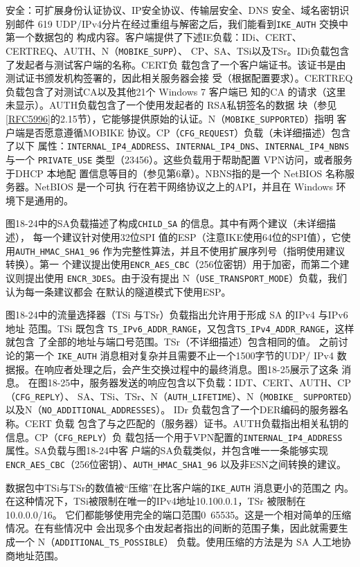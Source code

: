 安全：可扩展身份认证协议、IP安全协议、传输层安全、DNS 安全、域名密钥识别邮件 619
UDP/IPv4分片在经过重组与解密之后，我们能看到\verb|IKE_AUTH| 交换中第一个数据包的
构成内容。客户端提供了下述IE负载：IDi、CERT、CERTREQ、AUTH、N（\verb|MOBIKE_SUPP|）、
CP、SA、TSi以及TSr。IDi负载包含了发起者与测试客户端的名称。CERT负
载包含了一个客户端证书。该证书是由测试证书颁发机构签署的，因此相关服务器会接
受（根据配置要求）。CERTREQ负载包含了对测试CA以及其他21个 Windows 7 客户端已
知的CA 的请求（这里未显示）。AUTH负载包含了一个使用发起者的 RSA私钥签名的数据
块（参见\href{https://www.rfc-editor.org/rfc/rfc5996}{[RFC5996]}的2.15节），它能够提供原始的认证。N（\verb|MOBIKE_SUPPORTED|）指明
客户端是否愿意遵循MOBIKE 协议。CP（\verb|CFG_REQUEST|）负载（未详细描述）包含了以下
属性：\verb|INTERNAL_IP4_ADDRESS|、\verb|INTERNAL_IP4_DNS|、\verb|INTERNAL_IP4_NBNS| 与一个
\verb|PRIVATE_USE| 类型（23456）。这些负载用于帮助配置 VPN访问，或者服务于DHCP 本地配
置信息等目的（参见第6章）。NBNS指的是一个 NetBIOS 名称服务器。NetBIOS 是一个可执
行在若干网络协议之上的API，并且在 Windows 环境下是通用的。

图18-24中的SA负载描述了构成\verb|CHILD_SA| 的信息。其中有两个建议（未详细描述），
每一个建议针对使用32位SPI 值的ESP（注意IKE使用64位的SPI值），它使用\verb|AUTH_HMAC_SHA1_96|
 作为完整性算法，并且不使用扩展序列号（指明使用建议转换）。第一
个建议提出使用\verb|ENCR_AES_CBC|（256位密钥）用于加密，而第二个建议则提出使用
\verb|ENCR_3DES|。由于没有提出 N（\verb|USE_TRANSPORT_MODE|）负载，我们认为每一条建议都会
在默认的隧道模式下使用ESP。

图18-24中的流量选择器（TSi 与TSr）负载指出允许用于形成 SA 的IPv4 与IPv6地址
范围。TSi 既包含 \verb|TS_IPv6_ADDR_RANGE|，又包含\verb|TS_IPv4_ADDR_RANGE|，这样就包含
了全部的地址与端口号范围。TSr（不详细描述）包含相同的值。
之前讨论的第一个 \verb|IKE_AUTH| 消息相对复杂并且需要不止一个1500字节的UDP/
IPv4 数据报。在响应者处理之后，会产生交换过程中的最终消息。图18-25展示了这条
消息。
在图18-25中，服务器发送的响应包含以下负载：IDT、CERT、AUTH、CP（\verb|CFG_REPLY|）、
SA、TSi、TSr、N（\verb|AUTH_LIFETIME|）、N（\verb|MOBIKE_ SUPPORTED|）以及N（\verb|NO_ADDITIONAL_ADDRESSES|）。
IDr 负载包含了一个DER编码的服务器名称。CERT 负载
包含了与之匹配的（服务器）证书。AUTH负载指出相关私钥的信息。CP（\verb|CFG_REPLY|）负
载包括一个用于VPN配置的\verb|INTERNAL_IP4_ADDRESS| 属性。SA负载与图18-24中客
户端的SA负载类似，并包含唯一一条能够实现 \verb|ENCR_AES_CBC|（256位密钥）、\verb|AUTH_HMAC_SHA1_96|
以及非ESN之间转换的建议。

数据包中TSi与TSr的数值被“压缩”在比客户端的\verb|IKE_AUTH| 消息更小的范围之
内。在这种情况下，TSi被限制在唯一的IPv4地址10.100.0.1，TSr 被限制在10.0.0.0/16。
它们都能够使用完全的端口范围0~65535。这是一个相对简单的压缩情况。在有些情况中
会出现多个由发起者指出的间断的范围子集，因此就需要生成一个 N（\verb|ADDITIONAL_TS_POSSIBLE|）
负载。使用压缩的方法是为 SA 人工地协商地址范围。

